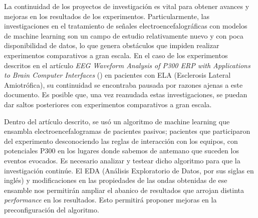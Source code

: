 \documentclass[../00_Main.tex]{subfiles}
\begin{document}
La continuidad de los proyectos de investigación es vital para obtener avances y mejoras en los resultados de los experimentos. Particularmente, las investigaciones en el tratamiento de señales electroencefalográficas con modelos de machine learning son un campo de estudio relativamente nuevo y con poca disponibilidad de datos, lo que genera obstáculos que impiden realizar experimentos comparativos a gran escala. En el caso de los experimentos descritos en el artículo \textit{EEG Waveform Analysis of P300 ERP with Applications to Brain Computer Interfaces} (\cite{EEGAnalysisBCI}) en pacientes con ELA (Esclerosis Lateral Amiotrófica), su continuidad se encontraba pausada por razones ajenas a este documento. Es posible que, una vez reanudada estas investigaciones, se puedan dar saltos posteriores con experimentos comparativos a gran escala.

Dentro del artículo descrito, se usó un algoritmo de machine learning que ensambla electroencefalogramas de pacientes pasivos; pacientes que participaron del experimento desconociendo las reglas de interacción con los equipos, con potenciales P300 en los lugares donde sabemos de antemano que suceden los eventos evocados. Es necesario analizar y testear dicho algoritmo para que la investigación continúe.
El EDA (Análisis Exploratorio de Datos, por sus siglas en inglés) y modificaciones en las propiedades de las ondas obtenidas de ese ensamble nos permitirán ampliar el abanico de resultados que arrojan distinta \textit{performance} en los resultados. Esto permitirá proponer mejoras en la preconfiguración del algoritmo.

\biblio %
\end{document}
